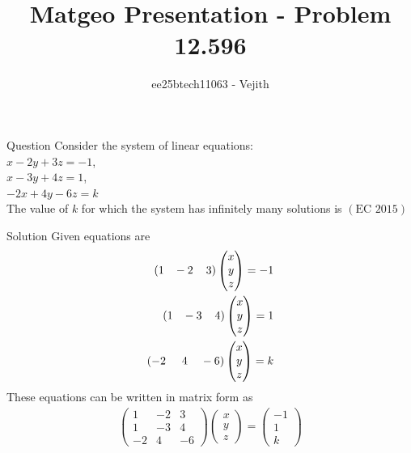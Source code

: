 \documentclass{beamer}
\title{Matgeo Presentation - Problem 12.596}
\author{ee25btech11063 - Vejith}
\numberwithin{equation}{section}
\providecommand{\brak}[1]{\ensuremath{\left(#1\right)}}
\theoremstyle{remark}
\newcommand{\myvec}[1]{\ensuremath{\begin{pmatrix}#1\end{pmatrix}}}
\begin{document}
\frame{\titlepage}
\begin{frame}{Question}
Consider the system of linear equations:\\
\hspace*{6cm} $x-2y+3z=-1$,\\
\hspace*{6cm} $x-3y+4z= 1$,\\
\hspace*{6cm} $-2x+4y-6z= k$\\
The value of $k$ for which the system has infinitely many solutions is \underline{\hspace{2cm}} \hspace{5cm} \brak{\text{EC } 2015}\\
\end{frame}

\begin{frame}{Solution}
    Given equations are
\begin{align}
    \brak{1 \hspace{0.3cm} -2 \hspace{0.4cm} 3}\myvec{x\\y\\z}=-1\\
     \brak{1 \hspace{0.3cm} -3 \hspace{0.4cm} 4}\myvec{x\\y\\z}=1\\
      \brak{-2 \hspace{0.5cm} 4 \hspace{0.4cm} -6}\myvec{x\\y\\z}=k
\end{align}
These equations can be written in matrix form as
\begin{align}
    \begin{pmatrix}
        1 & -2 & 3\\
        1 & -3 & 4\\
        -2 & 4 & -6
    \end{pmatrix}\myvec{x\\y\\z}=\myvec{-1\\1\\k}
\end{align}
\end{frame}
\end{document}

